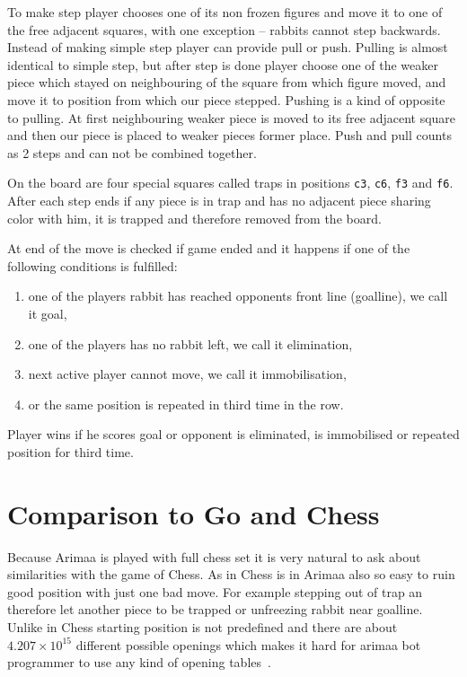 To make step player chooses one of its non frozen figures and move it to one of
the free adjacent squares, with one exception -- rabbits cannot step backwards.
Instead of making simple step player can provide pull or push. Pulling is
almost identical to simple step, but after step is done player choose one of
the weaker piece which stayed on neighbouring of the square from which figure
moved, and move it to position from which our piece stepped. Pushing is a kind
of opposite to pulling. At first neighbouring weaker piece is moved to its free
adjacent square and then our piece is placed to weaker pieces former place.
Push and pull counts as 2 steps and can not be combined together.

On the board are four special squares called traps in positions \texttt{c3},
\texttt{c6}, \texttt{f3} and \texttt{f6}. After each step ends if any piece is
in trap and has no adjacent piece sharing color with him, it is trapped and
therefore removed from the board.

At end of the move is checked if game ended and it happens if one of the
following conditions is fulfilled:
\begin{enumerate}
\item one of the players rabbit has reached opponents front line (goalline), we
call it goal,
\item one of the players has no rabbit left, we call it elimination,
\item next active player cannot move, we call it immobilisation,
\item or the same position is repeated in third time in the row.
\end{enumerate}

Player wins if he scores goal or opponent is eliminated, is immobilised or
repeated position for third time.


\section{Comparison to Go and Chess}
Because Arimaa is played with full chess set it is very natural to ask about
similarities with the game of Chess. As in Chess is in Arimaa also so easy to
ruin good position with just one bad move. For example stepping out of trap an
therefore let another piece to be trapped or unfreezing rabbit near goalline.
Unlike in Chess starting position is not predefined and there are about
$4.207\times10^{15}$ different possible openings which makes it hard for arimaa
bot programmer to use any kind of opening tables~\cite{COX}.

